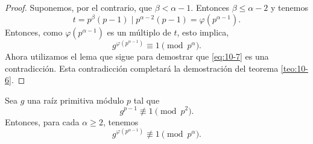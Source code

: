 \documentclass[12pt,a4paper]{book}
\begin{document}
\begin{proof}
        Suponemos, por el contrario, que $\beta<\alpha-1$. Entonces $\beta\leq\alpha-2$ y
        tenemos
        \begin{equation*}
            t=p^{\beta}(p-1)\mid p^{\alpha-2}(p-1)=\varphi(p^{\alpha-1}).
        \end{equation*}
        Entonces, como $\varphi(p^{\alpha-1})$ es un múltiplo de $t$, esto implica,
        \begin{equation}\label{eq:10-7}
            g^{\varphi(p^{\alpha-1})}\equiv1\pmod{p^{\alpha}}.
        \end{equation}
        Ahora utilizamos el lema que sigue para demostrar que \eqref{eq:10-7} es una
        contradicción. Esta contradicción completará la demostración del teorema
        \ref{teo:10-6}.
    \end{proof}

    \begin{lema}\label{lem:10-2}
        Sea $g$ una raíz primitiva módulo $p$ tal que
        \begin{equation}\label{eq:10-8}
            g^{p-1}\not\equiv1\pmod{p^{2}}.
        \end{equation}
        Entonces, para cada $\alpha\geq2$, tenemos
        \begin{equation}\label{eq:10-9}
            g^{\varphi(p^{\alpha-1})}\not\equiv1\pmod{p^{\alpha}}.
        \end{equation}
    \end{lema}
\end{document}
